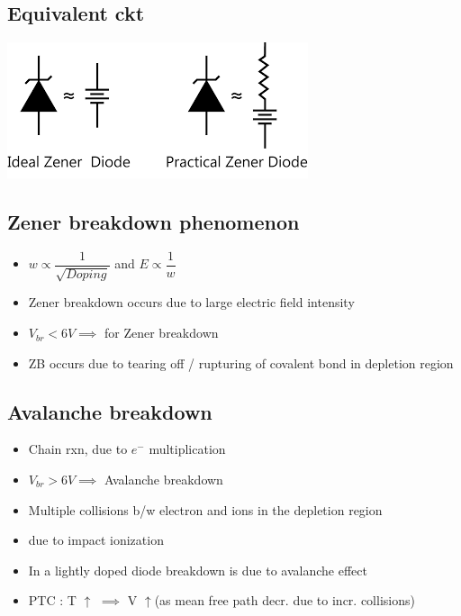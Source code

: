 \documentclass[10pt, a4paper]{report}
\begin{document}
	\subsection{Equivalent ckt}
	\includegraphics{img/zd equivalent}
	\subsection{Zener breakdown phenomenon}
	\begin{itemize}
		\item $ w \propto \dfrac{1}{\sqrt{Doping}} $ and $ E \propto\dfrac{1}{w} $
		\item Zener breakdown occurs due to large electric field intensity
		\item $ V_{br} < 6V \implies  $ for Zener breakdown
		\item ZB occurs due to tearing off / rupturing of covalent bond in depletion region
	\end{itemize}
	\subsection{Avalanche breakdown}
	\begin{itemize}
		\item Chain rxn, due to $ e^- $ multiplication
		\item $ V_{br} > 6V \implies  $ Avalanche breakdown
		\item Multiple collisions b/w electron and ions in the depletion region
		\item due to impact ionization
		\item In a lightly doped diode breakdown is due to avalanche effect
		\item PTC : T $\uparrow$ $ \implies $ V $\uparrow$(as mean free path decr. due to incr. collisions)
	\end{itemize}
	
\end{document}
